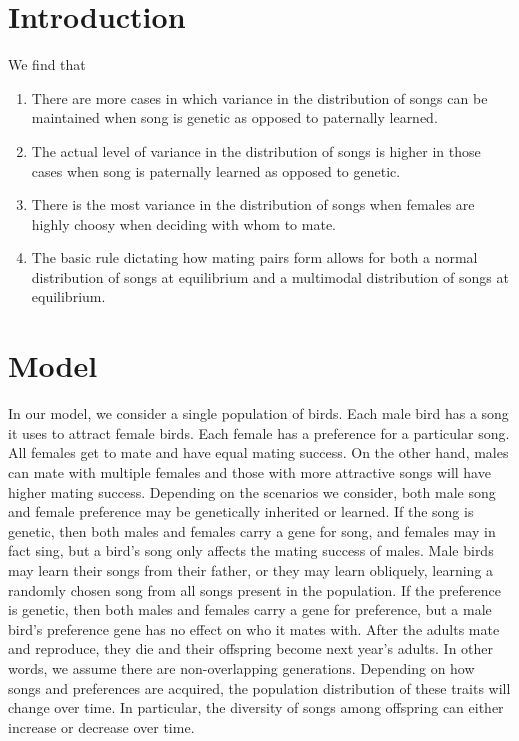 \documentclass{article}
\begin{document}

\section*{Introduction}
We find that 
\begin{enumerate}
\item There are more cases in which variance in the distribution of songs can be maintained when song is genetic as opposed to paternally learned.
\item The actual level of variance in the distribution of songs is higher in those cases when song is paternally learned as opposed to genetic.
\item There is the most variance in the distribution of songs when females are highly choosy when deciding with whom to mate.
\item The basic rule dictating how mating pairs form allows for both a normal distribution of songs at equilibrium and a multimodal distribution of songs at equilibrium.
\end{enumerate}

\section*{Model}

In our model, we consider a single population of birds. Each male bird has a song it uses to attract female birds. Each female has a preference for a particular song. All females get to mate and have equal mating success. On the other hand, males can mate with multiple females and those with more attractive songs will have higher mating success. Depending on the scenarios we consider, both male song and female preference may be genetically inherited or learned. If the song is genetic, then both males and females carry a gene for song, and females may in fact sing, but a bird's song only affects the mating success of males. Male birds may learn their songs from their father, or they may learn obliquely, learning a randomly chosen song from all songs present in the population. If the preference is genetic, then both males and females carry a gene for preference, but a male bird's preference gene has no effect on who it mates with. After the adults mate and reproduce, they die and their offspring become next year's adults. In other words, we assume there are non-overlapping generations. Depending on how songs and preferences are acquired, the population distribution of these traits will change over time. In particular, the diversity of songs among offspring can either increase or decrease over time.
\end{document}
